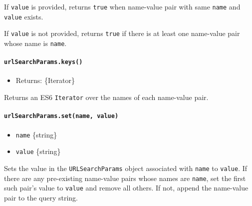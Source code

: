 If \texttt{value} is provided, returns \texttt{true} when name-value
pair with same \texttt{name} and \texttt{value} exists.

If \texttt{value} is not provided, returns \texttt{true} if there is at
least one name-value pair whose name is \texttt{name}.

\paragraph{\texorpdfstring{\texttt{urlSearchParams.keys()}}{urlSearchParams.keys()}}\label{urlsearchparams.keys}

\begin{itemize}
\tightlist
\item
  Returns: \{Iterator\}
\end{itemize}

Returns an ES6 \texttt{Iterator} over the names of each name-value pair.

\begin{Shaded}
\begin{Highlighting}[]
\OperatorTok{=}  \NormalTok{(}\NormalTok{)}\OperatorTok{;}
\NormalTok{ (}\NormalTok{()) \{}
  \OperatorTok{;}
\NormalTok{\}}
\end{Highlighting}
\end{Shaded}

\paragraph{\texorpdfstring{\texttt{urlSearchParams.set(name,\ value)}}{urlSearchParams.set(name, value)}}\label{urlsearchparams.setname-value}

\begin{itemize}
\tightlist
\item
  \texttt{name} \{string\}
\item
  \texttt{value} \{string\}
\end{itemize}

Sets the value in the \texttt{URLSearchParams} object associated with
\texttt{name} to \texttt{value}. If there are any pre-existing
name-value pairs whose names are \texttt{name}, set the first such
pair's value to \texttt{value} and remove all others. If not, append the
name-value pair to the query string.

